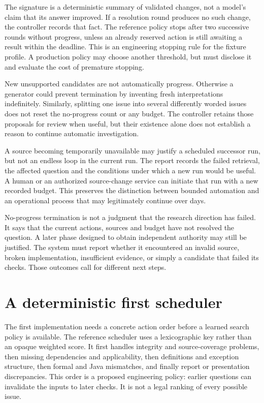 The signature is a deterministic summary of validated changes, not a model's
claim that its answer improved. If a resolution round produces no such change,
the controller records that fact. The reference policy stops after two successive
rounds without progress, unless an already reserved action is still awaiting a
result within the deadline. This is an engineering stopping rule for the fixture
profile. A production policy may choose another threshold, but must disclose it
and evaluate the cost of premature stopping.

New unsupported candidates are not automatically progress. Otherwise a generator
could prevent termination by inventing fresh interpretations indefinitely.
Similarly, splitting one issue into several differently worded issues does not
reset the no-progress count or any budget. The controller retains those proposals
for review when useful, but their existence alone does not establish a reason to
continue automatic investigation.

A source becoming temporarily unavailable may justify a scheduled successor run,
but not an endless loop in the current run. The report records the failed
retrieval, the affected question and the conditions under which a new run would
be useful. A human or an authorized source-change service can initiate that run
with a new recorded budget. This preserves the distinction between bounded
automation and an operational process that may legitimately continue over days.

No-progress termination is not a judgment that the research direction has failed.
It says that the current actions, sources and budget have not resolved the
question. A later phase designed to obtain independent authority may still be
justified. The system must report whether it encountered an invalid source,
broken implementation, insufficient evidence, or simply a candidate that failed
its checks. Those outcomes call for different next steps.

\section{A deterministic first scheduler}

The first implementation needs a concrete action order before a learned search
policy is available. The reference scheduler uses a lexicographic key rather
than an opaque weighted score. It first handles integrity and source-coverage
problems, then missing dependencies and applicability, then definitions and
exception structure, then formal and Java mismatches, and finally report or
presentation discrepancies. This order is a proposed engineering policy: earlier
questions can invalidate the inputs to later checks. It is not a legal ranking
of every possible issue.


